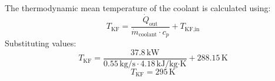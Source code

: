 The thermodynamic mean temperature of the coolant is calculated using:  
\[
T_{\text{KF}} = \frac{\dot{Q}_{\text{out}}}{\dot{m}_{\text{coolant}} \cdot c_p} + T_{\text{KF,in}}
\]  
Substituting values:  
\[
T_{\text{KF}} = \frac{37.8 \, \text{kW}}{0.55 \, \text{kg/s} \cdot 4.18 \, \text{kJ/kg·K}} + 288.15 \, \text{K}
\]  
\[
T_{\text{KF}} = 295 \, \text{K}
\]